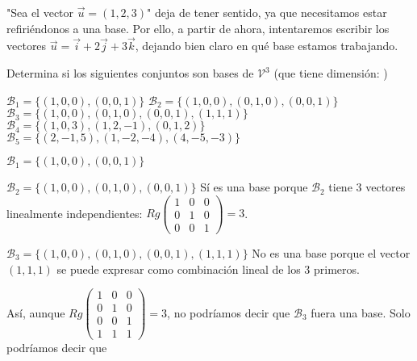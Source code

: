 \obs "Sea el vector $\vec{u} = (1,2,3)$" deja de tener sentido, ya que necesitamos estar refiriéndonos a una base. 
%
Por ello, a partir de ahora, intentaremos escribir los vectores $\vec{u} = \vec{i} + 2\vec{j} + 3\vec{k}$, dejando bien claro en qué base estamos trabajando.

\begin{problem}

  Determina si los siguientes conjuntos son bases de $\mathcal{V}^3$ (que tiene dimensión: )
    
\ppart $\mathcal{B}_1 = \{(1,0,0), (0,0,1)\}$
\ppart $\mathcal{B}_2 = \{(1,0,0), (0,1,0),(0,0,1)\}$
\ppart $\mathcal{B}_3 = \{(1,0,0), (0,1,0),(0,0,1),(1,1,1)\}$
\ppart $\mathcal{B}_4 = \{(1,0,3),(1,2,-1),(0,1,2)\}$
\ppart $\mathcal{B}_5 = \{(2,-1,5),(1,-2,-4),(4,-5,-3)\}$
    \solution

        
        \spart $\mathcal{B}_1 = \{(1,0,0), (0,0,1)\}$
        \subitem {}
        
        \spart $\mathcal{B}_2 = \{(1,0,0), (0,1,0),(0,0,1)\}$
        \subitem Sí es una base porque $\mathcal{B}_2$ tiene 3 vectores linealmente independientes: $Rg\displaystyle\begin{pmatrix}1&0&0\\0&1&0\\0&0&1\end{pmatrix} = 3$.
        
        \spart $\mathcal{B}_3 = \{(1,0,0), (0,1,0),(0,0,1),(1,1,1)\}$
        \subitem No es una base porque el vector $(1,1,1)$ se puede expresar como combinación lineal de los 3 primeros. 
        
        Así, aunque $\displaystyle Rg\begin{pmatrix}1&0&0\\0&1&0\\0&0&1\\1&1&1\end{pmatrix} = 3$, no podríamos decir que $\mathcal{B}_3$ fuera una base. Solo podríamos decir que 
        

\end{problem}
